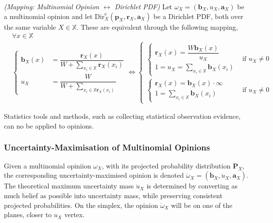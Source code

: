 \begin{definition}
    \emph{(Mapping: Multinomial Opinion $\leftrightarrow$ Dirichlet PDF)} Let $\omega_X = (\mathbf{b}_X, u_X, \mathbf{a}_X)$ be a multinomial opinion and let $\mathrm{Dir}^\mathrm{e}_X(\mathbf{p}_X, \mathbf{r}_X, \mathbf{a}_X)$ be a Dirichlet PDF, both over the same variable $X \in \mathbb{X}$. These are equivalent through the following mapping,
    \begin{equation}
        \begin{split}
            & \forall x \in \mathbb{X} \\
            & \begin{cases}
                \mathbf{b}_X(x) & = \dfrac{\mathbf{r}_X(x)}{W + \sum\limits_{x_i \in \mathbb{X}} \mathbf{r}_X(x_i)} \\
                u_X & = \dfrac{W}{W + \sum\limits_{x_i \in \mathbb{X} \mathbf{r}_X(x_i)}}
            \end{cases} \Leftrightarrow
            \begin{cases}
                \begin{cases}
                    \mathbf{r}_X(x) = \dfrac{W \mathbf{b}_X(x)}{u_X} \\
                    1 = u_X = \sum\limits_{x_i \in \mathbb{X}} \mathbf{b}_X(x_i)
                \end{cases} & \text{if } u_X \neq 0 \\
                \begin{cases}
                    \mathbf{r}_X(x) = \mathbf{b}_X(x) \cdot \infty \\
                    1 = \sum\limits_{x_i \in \mathbb{X}} \mathbf{b}_X(x_i)
                \end{cases} & \text{if } u_X \neq 0
            \end{cases}
        \end{split}
    \end{equation}
\end{definition}

Statistics tools and methods, such as collecting statistical observation evidence, can no be applied to opinions.

\subsubsection{Uncertainty-Maximisation of Multinomial Opinions}

Given a multinomial opiniion $\omega_X$, with its projected probability distribution $\mathbf{P}_X$, the corresponding uncertainty-maximised opinion is denoted $\ddot{\omega}_X = (\ddot{\mathbf{b}}_X, \ddot{u}_X, \mathbf{a}_X)$. The theoretical maximum uncertainty mass $\ddot{u}_X$ is determined by converting as much belief as possible into uncertainty mass, while preserving consistent projected probabilities. On the simplex, the opinion $\ddot{\omega}_X$ will be on one of the planes, closer to $u_X$ vertex.

